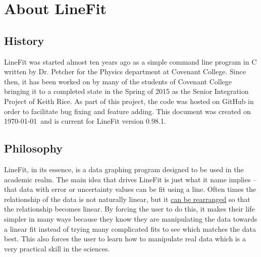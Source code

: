 \documentclass[titlepage,12pt]{article}
\begin{document}
\tableofcontents
\newpage


\section{About LineFit}


\subsection{History}
LineFit was started almost ten years ago as a simple command line program in C written by Dr. Petcher for the Physics department at Covenant College. Since then, it has been worked on by many of the students of Covenant College bringing it to a completed state in the Spring of 2015 as the Senior Integration Project of Keith Rice. As part of this project, the code was hosted on GitHub in order to facilitate bug fixing and feature adding. This document was created on \today ~and is current for LineFit version 0.98.1.



\subsection{Philosophy}
LineFit, in its essence, is a data graphing program designed to be used in the academic realm. The main idea that drives LineFit is just what it name implies – that data with error or uncertainty values can be fit using a line. Often times the relationship of the data is not naturally linear, but it \hyperref[sec:dataManipulation]{can be rearranged} so that the relationship becomes linear. By forcing the user to do this, it makes their life simpler in many ways because they know they are manipulating the data towards a linear fit instead of trying many complicated fits to see which matches the data best. This also forces the user to learn how to manipulate real data which is a very practical skill in the sciences.
\end{document}
